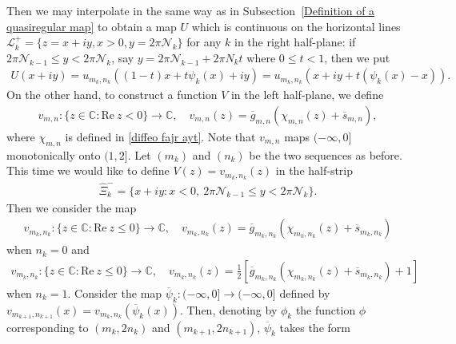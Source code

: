 \documentclass[12pt]{amsart}
\numberwithin{equation}{section}
\begin{document}
Then we may interpolate in the same way as in Subsection~\ref{Definition of a quasiregular map} to obtain a map $U$ which is continuous on the horizontal lines $\mathcal{L}^{+}_{k}=\{z=x+iy, x>0, y=2\pi\mathcal{N}_k\}$ for any $k$ in the right half-plane: if $2\pi \mathcal{N}_{k-1}\leq y<2\pi\mathcal{N}_k$, say $y=2\pi \mathcal{N}_{k-1}+2\pi N_kt$ where $0\leq t<1$, then we put
\begin{equation*}
\begin{split}
U(x+iy)=u_{m_{k},n_{k}}((1-t)x+t\psi_k(x)+iy)=u_{m_{k},n_{k}}(x+iy+t(\psi_k(x)-x)).
\end{split}
\end{equation*}
On the other hand, to construct a function $V$ in the left half-plane, we define
\begin{equation*}
\begin{split}
v_{m,n}:\{z\in\mathbb{C}: \text{Re}\ z< 0\}\to \mathbb{C},  \quad v_{m,n}(z)=\overline{g}_{m,n}\left(\chi_{m,n}(z)+\overline{s}_{m,n}\right),
\end{split}
\end{equation*}
where $\chi_{m,n}$ is defined in \eqref{diffeo  fajr  ayt}. Note that $v_{m,n}$ maps $(-\infty,0]$ monotonically onto $(1,2]$. Let $(m_k)$ and $(n_k)$ be the two sequences as before. This time we would like to define $V(z)=v_{m_k,n_k}(z)$ in the half-strip
\begin{equation*}
\begin{split}
\hat{\Xi}_k^{-}=\{x+iy: x<0, \ 2\pi \mathcal{N}_{k-1}\leq y<2\pi \mathcal{N}_k\}.
\end{split}
\end{equation*}
Then we consider the map
\begin{equation*}
\begin{split}
v_{m_k,n_k}: \{z\in\mathbb{C}: \text{Re}\ z\leq0 \}\to\mathbb{C}, \quad v_{m_k,n_k}(z)=\overline{g}_{m_k,n_k}(\chi_{m_k,n_k}(z)+\overline{s}_{m_k,n_k})
\end{split}
\end{equation*}
when $n_k=0$ and
\begin{equation*}
\begin{split}
v_{m_k,n_k}: \{z\in\mathbb{C}: \text{Re}\ z\leq0 \}\to\mathbb{C}, \quad v_{m_k,n_k}(z)=\frac{1}{2}\left[\overline{g}_{m_k,n_k}(\chi_{m_k,n_k}(z)+\overline{s}_{m_k,n_k})+1\right]
\end{split}
\end{equation*}
when $n_k=1$. Consider the map $\overline{\psi}_k:(-\infty,0]\to (-\infty,0]$ defined by $v_{m_{k+1},n_{k+1}}(x)=v_{m_k,n_k}(\overline{\psi}_k(x))$. Then, denoting by $\phi_k$ the function $\phi$ corresponding to $(m_k,2n_k)$ and $(m_{k+1},2n_{k+1})$, $\overline{\psi}_k$ takes the form
\end{document}
